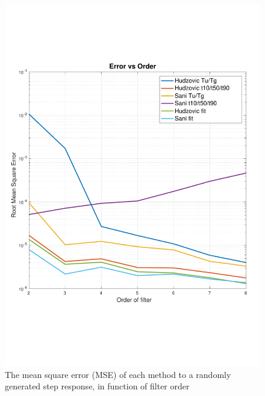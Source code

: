 \begin{figure}
    \includegraphics[width=\linewidth]{images/error_order}
    \caption{The mean square error (MSE) of each method to a randomly generated step response, in function of filter order}
    \label{fig:error_order}
\end{figure}
